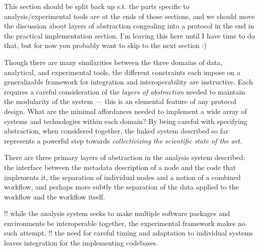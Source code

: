 \documentclass[10pt]{tufte-book}
\begin{document}
This section should be split back up s.t. the parts specific to
analysis/experimental tools are at the ends of those sections, and we
should move the discussion about layers of abstraction congealing into a
protocol in the end in the practical implementation section. I'm leaving
this here until I have time to do that, but for now you probably want to
skip to the next section :)

Though there are many similarities between the three domains of data,
analytical, and experimental tools, the different constraints each
impose on a generalizable framework for integration and interoperability
are instructive. Each requires a careful consideration of the
\emph{layers of abstraction} needed to maintain the modularity of the
system --- this is an elemental feature of any protocol design. What are
the minimal affordances needed to implement a wide array of systems and
technologies within each domain? By being careful with specifying
abstraction, when considered together, the linked system described so
far represents a powerful step towards \emph{collectivizing the
scientific state of the art.}

There are three primary layers of abstraction in the analysis system
described: the interface between the metadata description of a node and
the code that implements it, the separation of individual nodes and a
notion of a combined workflow, and perhaps more subtly the separation of
the data applied to the workflow and the workflow itself.

!! while the analysis system seeks to make multiple software packages
and environments be interoperable together, the experimental framework
makes no such attempt. !! the need for careful timing and adaptation to
individual systems leaves integration for the implementing codebases.
\end{document}
